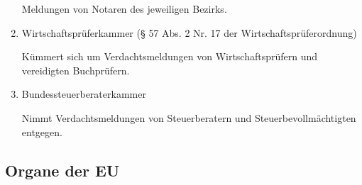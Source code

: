 \documentclass{article}
\begin{document}
\begin{enumerate}
                    Meldungen von Notaren des jeweiligen Bezirks.

                \item Wirtschaftsprüferkammer (§ 57 Abs. 2 Nr. 17 der Wirtschaftsprüferordnung)
                
                    Kümmert sich um Verdachtsmeldungen von Wirtschaftsprüfern und vereidigten Buchprüfern.

                \item Bundessteuerberaterkammer

                    Nimmt Verdachtsmeldungen von Steuerberatern und Steuerbevollmächtigten entgegen.

            \end{enumerate}

\newpage

        \subsection[Organe EU]{Organe der EU}
\end{document}
